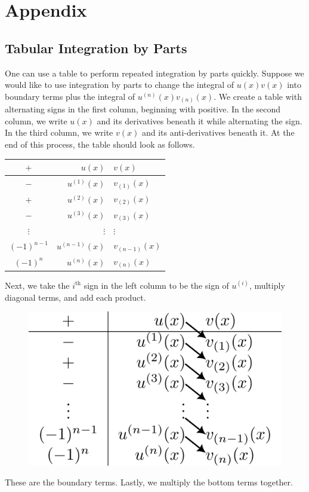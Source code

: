 \newpage
\section{Appendix}
\subsection{Tabular Integration by Parts}
\label{appendix:parts}
    One can use a table to perform repeated integration by parts quickly. Suppose we would like to use integration by parts to change the integral of \(u(x)v(x)\) into boundary terms plus the integral of \(u^{(n)}(x)v_{(n)}(x)\). We create a table with alternating signs in the first column, beginning with positive. In the second column, we write \(u(x)\) and its derivatives beneath it while alternating the sign. In the third column, we write \(v(x)\) and its anti-derivatives beneath it. At the end of this process, the table should look as follows.
    \begin{table}[H]
        \centering
        \begin{tabular}{c|rl}
            \(+\) & \(u(x)\) & \(v(x)\)\\
            \hline
            \(-\) &\(u^{(1)}(x)\) & \(v_{(1)}(x)\)\\
            \(+\) & \(u^{(2)}(x)\) & \(v_{(2)}(x)\)\\
            \(-\) & \(u^{(3)}(x)\) & \(v_{(3)}(x)\)\\
            \(\vdots\) &\(\vdots\) & \(\vdots \)\\
            \((-1)^{n-1}\) & \(u^{(n-1)}(x)\) & \(v_{(n-1)}(x)\)\\
            \((-1)^n\) & \(u^{(n)}(x)\) & \(v_{(n)}(x)\)
        \end{tabular}
    \end{table}
    Next, we take the \(i^{\mathrm{th}}\) sign in the left column to be the sign of \(u^{(i)}\), multiply diagonal terms, and add each product.
    \begin{figure}[H]
        \centering
        \includegraphics[width=0.34\linewidth]{include/tabular-boundary.png}
    \end{figure}
    These are the boundary terms. Lastly, we multiply the bottom terms together. 
